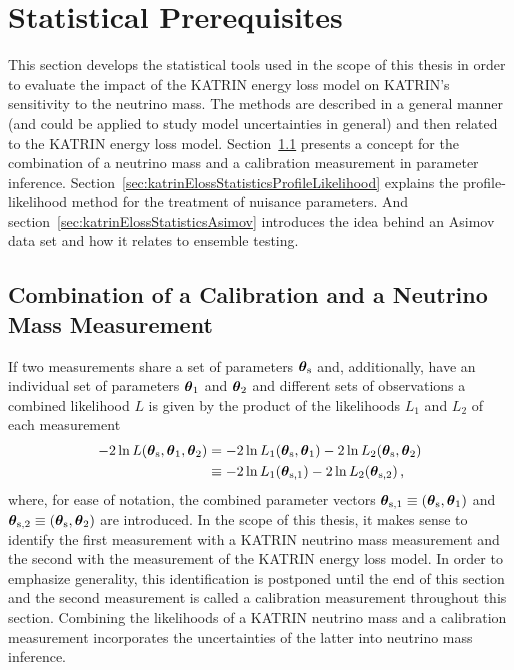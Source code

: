 \def\currentRootFolder{chapter/sensitivityStudyWithPreliminaryKatrinElossModel/statisticalPrerequisites}
\def\currentFigureFolder{\currentRootFolder/fig}



\section{Statistical Prerequisites}
\label{sec:katrinElossStatistics}
This section develops the statistical tools used in the scope of this thesis in order to evaluate the impact of the KATRIN energy loss model on KATRIN's sensitivity to the neutrino mass. The methods are described in a general manner (and could be applied to study model uncertainties in general) and then related to the KATRIN energy loss model. Section~\ref{sec:katrinElossStatisticsCombMeasurements} presents a concept for the combination of a neutrino mass and a calibration measurement in parameter inference. Section~\ref{sec:katrinElossStatisticsProfileLikelihood} explains the profile-likelihood method for the treatment of nuisance parameters. And section~\ref{sec:katrinElossStatisticsAsimov} introduces the idea behind an Asimov data set and how it relates to ensemble testing.

\subsection{Combination of a Calibration and a Neutrino Mass Measurement}
\label{sec:katrinElossStatisticsCombMeasurements}
If two measurements share a set of parameters $\boldsymbol{\mathbf{\theta}}_\mathrm{s}$ and, additionally, have an individual set of parameters $\boldsymbol{\mathbf{\theta}}_1$ and $\boldsymbol{\mathbf{\theta}}_2$ and different sets of observations a combined likelihood $L$ is given by the product of the likelihoods $L_1$ and $L_2$ of each measurement~\cite{ReviewOfParticlePhysics}
\newcommand{\paramVecSOne}{\paramVec_\mathrm{s,1}}
\newcommand{\paramVecSTwo}{\paramVec_\mathrm{s,2}}
\begin{align}
-2\ln L(\paramVecShared, \paramVec_1, \paramVec_2) &=  
-2\ln L_1(\paramVecShared, \paramVec_1)
-2\ln L_2(\paramVecShared, \paramVec_2)
\nonumber \\
&\equiv
-2\ln L_1(\paramVecSOne)
-2\ln L_2(\paramVecSTwo)
\label{eq:katrinElossStatisticsCombinedLikelihood}
\comma
\end{align}
where, for ease of notation, the combined parameter vectors $\boldsymbol{\mathbf{\theta}}_\mathrm{s,1}\equiv(\boldsymbol{\mathbf{\theta}}_\mathrm{s},\boldsymbol{\mathbf{\theta}}_1)$ and 
$\boldsymbol{\mathbf{\theta}}_\mathrm{s,2}\equiv(\boldsymbol{\mathbf{\theta}}_\mathrm{s},\boldsymbol{\mathbf{\theta}}_2)$ are introduced. In the scope of this thesis, it makes sense to identify the first measurement with a KATRIN neutrino mass measurement and the second with the measurement of the KATRIN energy loss model. In order to emphasize generality, this identification is postponed until the end of this section and the second measurement is called a calibration measurement throughout this section. Combining the likelihoods of a KATRIN neutrino mass and a calibration measurement incorporates the uncertainties of the latter into neutrino mass inference. 

